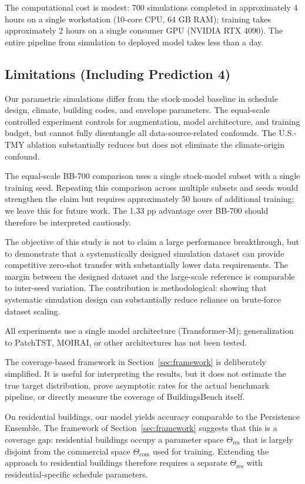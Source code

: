 \documentclass[preprint,12pt,authoryear]{elsarticle}
\begin{document}
The computational cost is modest: 700 simulations completed in approximately 4 hours on a single workstation (10-core CPU, 64 GB RAM); training takes approximately 2 hours on a single consumer GPU (NVIDIA RTX 4090). The entire pipeline from simulation to deployed model takes less than a day.

\subsection{Limitations (Including Prediction 4)}
\label{sec:limitations}

Our parametric simulations differ from the stock-model baseline in schedule design, climate, building codes, and envelope parameters. The equal-scale controlled experiment controls for augmentation, model architecture, and training budget, but cannot fully disentangle all data-source-related confounds. The U.S.-TMY ablation substantially reduces but does not eliminate the climate-origin confound.

The equal-scale BB-700 comparison uses a single stock-model subset with a single training seed. Repeating this comparison across multiple subsets and seeds would strengthen the claim but requires approximately 50 hours of additional training; we leave this for future work. The 1.33 pp advantage over BB-700 should therefore be interpreted cautiously.

The objective of this study is not to claim a large performance breakthrough, but to demonstrate that a systematically designed simulation dataset can provide competitive zero-shot transfer with substantially lower data requirements. The margin between the designed dataset and the large-scale reference is comparable to inter-seed variation. The contribution is methodological: showing that systematic simulation design can substantially reduce reliance on brute-force dataset scaling.

All experiments use a single model architecture (Transformer-M); generalization to PatchTST, MOIRAI, or other architectures has not been tested.

The coverage-based framework in Section~\ref{sec:framework} is deliberately simplified. It is useful for interpreting the results, but it does not estimate the true target distribution, prove asymptotic rates for the actual benchmark pipeline, or directly measure the coverage of BuildingsBench itself.

On residential buildings, our model yields accuracy comparable to the Persistence Ensemble. The framework of Section~\ref{sec:framework} suggests that this is a coverage gap: residential buildings occupy a parameter space $\Theta_{\text{res}}$ that is largely disjoint from the commercial space $\Theta_{\text{com}}$ used for training. Extending the approach to residential buildings therefore requires a separate $\Theta_{\text{res}}$ with residential-specific schedule parameters.
\end{document}
